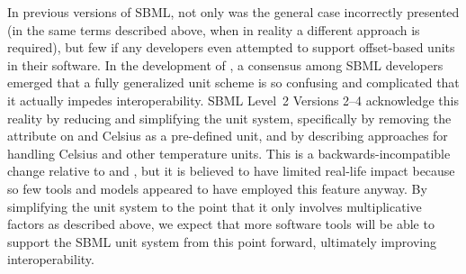 In previous versions of SBML, not only was the general case
incorrectly presented (\ie in the same terms described above, when
in reality a different approach is required), but few if any
developers even attempted to support offset-based units in their
software.  In the development of \sbmltwotwo, a consensus among
SBML developers emerged that a fully generalized unit scheme
is so confusing and complicated that it actually impedes
interoperability.  SBML Level~2 Versions 2--4 acknowledge this reality by reducing
and simplifying the unit system, specifically by removing the
 attribute on \Unit and Celsius as a pre-defined unit,
and by describing approaches for handling Celsius and other
temperature units.  This is a backwards-incompatible change
relative to \sbmltwoone and \sbmlonetwo, but it is believed to
have limited real-life impact because so few tools and models
appeared to have employed this feature anyway.  By simplifying the
unit system to the point that it only involves multiplicative
factors as described above, we expect that more software tools
will be able to support the SBML unit system from this point
forward, ultimately improving interoperability.

